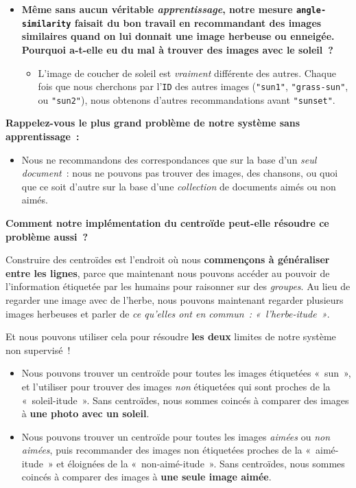 \documentclass[12pt,a4paper]{article}
\begin{document}
\begin{thinkbox}
  \begin{itemize}
    \item \textbf{Même sans aucun véritable \emph{apprentissage}, notre mesure \texttt{angle-similarity} faisait du bon travail en recommandant des images similaires quand on lui donnait une image herbeuse ou enneigée. Pourquoi a-t-elle eu du mal à trouver des images avec le soleil~?}
    \begin{itemize}
      \item L'image de coucher de soleil est \emph{vraiment} différente des autres. Chaque fois que nous cherchons par l'\texttt{ID} des autres images (\texttt{"sun1"}, \texttt{"grass-sun"}, ou \texttt{"sun2"}), nous obtenons d'autres recommandations avant \texttt{"sunset"}.
    \end{itemize}
  \end{itemize}
\end{thinkbox}

\begin{keypointbox}
  \textbf{Rappelez-vous le plus grand problème de notre système sans apprentissage~:}

  \begin{itemize}
    \item Nous ne recommandons des correspondances que sur la base d'un \emph{seul document}~: nous ne pouvons pas trouver des images, des chansons, ou quoi que ce soit d'autre sur la base d'une \emph{collection} de documents aimés ou non aimés.
  \end{itemize}

  \textbf{Comment notre implémentation du centroïde peut-elle résoudre ce problème aussi~?}

  Construire des centroïdes est l'endroit où nous \textbf{commençons à généraliser entre les lignes}, parce que maintenant nous pouvons accéder au pouvoir de l'information étiquetée par les humains pour raisonner sur des \emph{groupes}. Au lieu de regarder une image avec de l'herbe, nous pouvons maintenant regarder plusieurs images herbeuses et parler de \emph{ce qu'elles ont en commun~: «~l'herbe-itude~»}.

  Et nous pouvons utiliser cela pour résoudre \textbf{les deux} limites de notre système non supervisé~!
  \begin{itemize}
    \item Nous pouvons trouver un centroïde pour toutes les images étiquetées «~sun~», et l'utiliser pour trouver des images \emph{non} étiquetées qui sont proches de la «~soleil-itude~». Sans centroïdes, nous sommes coincés à comparer des images à \textbf{une photo avec un soleil}.
    \item Nous pouvons trouver un centroïde pour toutes les images \emph{aimées} ou \emph{non aimées}, puis recommander des images non étiquetées proches de la «~aimé-itude~» et éloignées de la «~non-aimé-itude~». Sans centroïdes, nous sommes coincés à comparer des images à \textbf{une seule image aimée}.
  \end{itemize}
\end{keypointbox}
\end{document}
